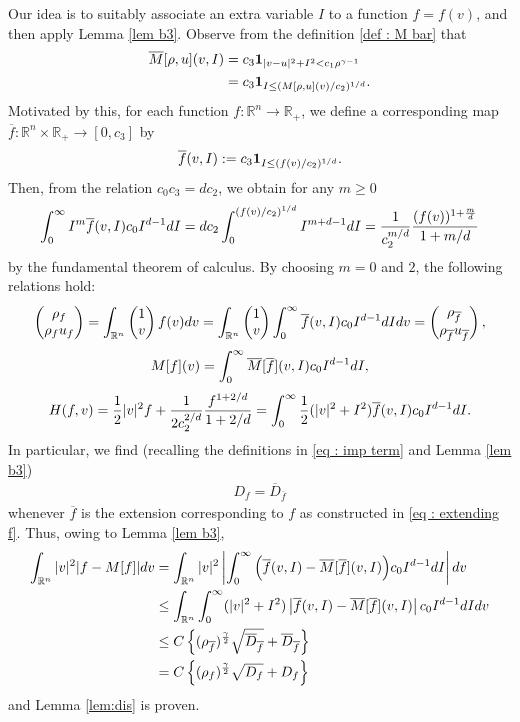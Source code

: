 \documentclass{amsart}
\theoremstyle{plain}
\theoremstyle{remark}
\numberwithin{equation}{section}
\newcommand{\R}{\mathbb{R}}
\newcommand{\dv}{\textnormal{d}v}
\newcommand{\di}{\textnormal{d}I}
\newcommand{\lt}{\left}
\newcommand{\rt}{\right}
\newcommand{\intr}{\int_{\R^n}}
\newcommand{\ov}{\overline}
\begin{document}
Our idea is to suitably associate an extra variable $I$ to a function $f=f(v)$, and then apply Lemma \ref{lem b3}. Observe from the definition \eqref{def : M bar} that
\begin{align*}
\overline{M}[\rho,u](v,I) &= c_3 \mathbf{1}_{|v-u|^2 + I^2 < c_1 \rho^{\gamma-1}}\\
&= c_3 {\bf 1}_{I \le (M[\rho,u](v)/c_2)^{1/d}}.
\end{align*}
Motivated by this, for each function $f:\R^n \to \R_+$, we define a corresponding map $\ov{f}:\R^n\times \R_+\to [0,c_3]$ by
\begin{equation}
\label{eq : extending f}
\ov{f}(v,I) := c_3 {\bf{1}}_{I \le (f(v)/c_2)^{1/d}}.
\end{equation}
Then, from the relation $c_0c_3 = dc_2$, we obtain for any $m\ge 0$
\[
\int_0^\infty I^m \ov{f}(v,I) c_0I^{d-1}\di  = dc_2 \int_0^{(f(v)/c_2)^{1/d}} I^{m+d-1}\di = \frac{1}{c_2^{m/d}}\frac{(f(v))^{1+\frac{m}{d}}}{1+m/d}
\]
by the fundamental theorem of calculus. By choosing $m=0$ and $2$, the following relations hold:
\[
\begin{pmatrix} \rho_f \\ \rho_f u_f \end{pmatrix} = \intr  \begin{pmatrix} 1 \\ v \end{pmatrix}f(v) \dv = \intr \begin{pmatrix} 1 \\ v \end{pmatrix}\int_0^\infty \ov{f}(v,I) c_0 I^{d-1}\di \dv
= \begin{pmatrix} \rho_{\ov{f}}  \\ \rho_{\ov{f}} u_{\ov{f}} \end{pmatrix},
\]
\[
M[f](v) = \int_0^\infty \ov{M}[\ov{f}](v,I)c_0I^{d-1}\di,
\]
\[
H(f,v)= \frac{1}{2}|v|^2f + \frac{1}{2c_2^{2/d}}\frac{f^{1+2/d}}{1+2/d} = \int_0^\infty \frac{1}{2}(|v|^2 + I^2) \ov{f}(v,I) c_0I^{d-1}\di.
\]
In particular, we find (recalling the definitions in \eqref{eq : imp term} and Lemma \ref{lem b3})
\begin{align*}
    D_f = \overline{D}_{\ov f}
\end{align*}
whenever $\ov f$ is the extension corresponding to $f$ as constructed in \eqref{eq : extending f}. Thus, owing to Lemma \ref{lem b3},
{\allowdisplaybreaks\begin{align*}
\intr |v|^2 |f-M[f]| \dv
&= \intr |v|^2\lt|\int_0^\infty  \Big( \ov{f}(v,I)-\ov{M}[\ov{f}](v,I) \Big) c_0I^{d-1}\di \rt| \dv \\
&\le \int_{\R^n}\int_0^\infty (|v|^2 + I^2) \lt|\ov{f}(v,I)-\ov{M}[\ov{f}](v,I) \rt| c_0I^{d-1}\di\dv \\
&\le C \lt\{(\rho_{\ov{f}})^{\frac{\gamma}{2}}\sqrt{\ov{D}_{\ov f}} + \ov{D}_{\ov f}\rt\} \\
&= C \lt\{(\rho_{f})^{\frac{\gamma}{2}}\sqrt{D_f} + D_f \rt\}
\end{align*}}
and Lemma \ref{lem:dis} is proven.
\end{document}
